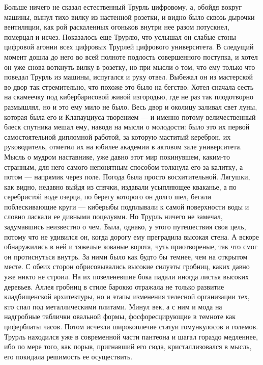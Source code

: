 Больше ничего не сказал естественный Трурль цифровому, а,
обойдя вокруг машины, вынул тихо вилку из настенной розетки,
и видно было сквозь дырочки вентиляции, как рой раскаленных
огоньков внутри нее разом потускнел, померцал и исчез.
Показалось еще Трурлю, что услышал он слабые стоны цифровой
агонии всех цифровых Трурлей цифрового университета. В
следущий момент дошла до него во всей полноте подлость
совершенного поступка, и хотел он уже снова воткнуть вилку в
розетку, но при мысли о том, что ему только что поведал
Трурль из машины, испугался и руку отвел. Выбежал он из
мастерской во двор так стремительно, что похоже это было на
бегство. Хотел сначала сесть на скамеечку под кибербарисовой
живой изгородью, где не раз так плодотворно размышлял, но и
это ему мило не было. Весь двор и околицу заливал свет луны,
которая была его и Клапауциуса творением --- и именно потому
величественный блеск спутника мешал ему, наводя на мысли о
молодости: было это их первой самостоятельной дипломной
работой, за которую маститый кереброн, их руководитель,
отметил их на юбилее академии в актовом зале университета.
Мысль о мудром наставнике, уже давно этот мир покинувшем,
каким-то странным, для него самого непонятным способом
толкнула его за калитку, а потом --- напрямик через поле.
Погода была просто восхитительной. Лягушки, как видно,
недавно выйдя из спячки, издавали усыпляющее кваканье, а по
серебристой воде озерца, по берегу которого он долго шел,
бегали поблескивающие круги --- киберыбы подплывали к самой
поверхности воды и словно ласкали ее дивными поцелуями. Но
Трурль ничего не замечал, задумавшись неизвестно о чем.
Была, однако, у этого путешествия своя цель, потому что не
удивился он, когда дорогу ему преградила высокая стена. А
вскоре обнаружились в ней и тяжелые кованые ворота, чуть
приотвореные, так что смог он протиснуться внутрь. За ними
было как будто бы темнее, чем на открытом месте. С обеих
сторон обрисовывались высокие силуэты гробниц, каких давно
уже никто не строил. На их позеленевшие бока падали иногда
листья высоких деревьев. Аллея гробниц в стиле барокко
отражала не только развитие кладбищенской архитектуры, но и
этапы изменения телесной организации тех, кто спал под
металлическими плитами. Минул век, а с ним и мода на
надгробные таблички овальной формы, фосфоресцирующие в
темноте как циферблаты часов. Потом исчезли широкоплечие
статуи гомункулосов и големов. Трурль находился уже в
современной части пантеона и шагал гораздо медленнее, ибо по
мере того, как порыв, пригнавший его сюда, кристаллизовался
в мысль, его покидала решимость ее осуществить.


